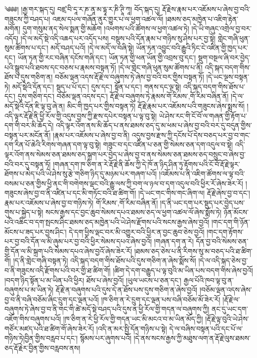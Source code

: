 \setcounter{footnote}{0} 
༄༅༅། །རྒྱ་གར་སྐད་དུ། བཛྲ་བི་དཱ་ར་ཎ་ནཱ་མ་དྷཱ་ར་ཎི་ཊཱི་ཀཱ། བོད་སྐད་དུ། རྡོ་རྗེས་རྣམ་པར་འཇོམས་པ་ཞེས་བྱ་བའི་གཟུངས་ཀྱི་བཤད་པ། འཇམ་དཔལ་གཞོན་ནུར་གྱུར་པ་ལ་ཕྱག་འཚལ་ལོ། །ཐམས་ཅད་མཁྱེན་པ་འཇིག་རྟེན་མགོན། དུག་གསུམ་ནད་སེལ་སྨན་གྱི་མཆོག །འཕགས་པའི་ཚོགས་ལ་ཕྱག་འཚལ་ཏེ། །དེ་ཡི་གཞུང་འགྲེལ་བྱ་བར་འདོད། །དེ་ལ་མདོ་སྡེ་འདི་འཆད་པར་འདོད་པས། བསྡུས་པའི་དོན་རྣམ་པ་གཉིས་སུ་ཤེས་པར་བྱ་སྟེ། གླེང་གཞི་ཕུན་སུམ་ཚོགས་པ་དང་། མདོ་བཤད་པའོ། །དེ་ལ་མདོ་ལ་བཞི་སྟེ། ཡོན་ཏན་འབྱུང་བའི་རྒྱུའི་ཏིང་ངེ་འཛིན་གྱི་ཁྱད་པར་དང་། ཡོན་ཏན་གྱི་རང་བཞིན་དངོས་གཞི་དང་། ཡོན་ཏན་གྱི་ཕན་ཡོན་གྱི་འབྲས་བུ་དང་། སྡུག་བསྔལ་ཞི་བར་བྱེད་པའི་སྒྲུབ་པའི་ཐབས་དང་བཅས་པ་རྣམས་བསྟན་ཏོ། །དེ་ལ་གླེང་གཞི་ཕུན་སུམ་ཚོགས་པ་ནི། འདི་སྐད་བདག་གིས་ཐོས་པ་དུས་གཅིག་ན། བཅོམ་ལྡན་འདས་རྡོ་རྗེ་ལ་བཞུགས་ཏེ་ཞེས་བྱ་བའི་བར་གྱིས་བསྟན་ཏོ། །དེ་ཡང་ལྔས་བསྟན་ཏེ། མདོ་སྡེའི་དོན་དང་། སྡུད་པ་པོ་དང་། དུས་དང་། སྟོན་པ་དང་། གནས་དང་ལྔ་སྟེ། འདི་སྐད་བདག་གིས་ཐོས་པ་དང་། དུས་གཅིག་དང་། བཅོམ་ལྡན་འདས་དང་། རྡོ་རྗེ་ལ་བཞུགས་ཏེ་རྣམས་{གོ་རིམས་,གོ་རིམ་}བཞིན་ནོ། །དེ་ལ་མདོ་སྡེའི་དོན་ཇི་ལྟ་བུ་ཞེ་ན། མིང་གི་ཁྱད་པར་གྱིས་བསྟན་ཏེ། རྡོ་རྗེ་རྣམ་པར་འཇོམས་པའི་གཟུངས་ཞེས་སྨྲས་སོ། །འདི་ལྟར་རྡོ་རྗེ་ནི་ཕྱི་རོལ་གྱི་འདུས་བྱས་ཀྱི་རྫས་དཔེར་བསྟན་པ་ལྟ་བུ་སྟེ། ཡེ་ཤེས་རང་གི་ངོ་བོ་ལ་གཞན་གྱི་རྟོག་པ་དག་གི་བར་མི་ཆོད་དེ། འདི་ལྟར་འོག་ནས་མི་ཆོད་པ་ནས་ཐམས་ཅད་དུ་མ་ཕམ་པ་ཞེས་བྱ་བའི་བར་དུ་བདུན་གྱིས་བསྟན་པར་མངོན་ནོ། །རྣམ་པར་འཇོམས་པ་ཞེས་བྱ་བ་ནི། འདུས་བྱས་རྫས་ཀྱི་དངོས་པོ་དེས་བཅད་པར་བྱ་བ་གང་དག་རིན་པོ་ཆེའི་རིགས་གཞན་དག་ལྟ་བུ་སྟེ། གཟུང་བ་དང་འཛིན་པ་ཅན་གྱི་སེམས་ཅན་དག་འདུལ་བ་སྟེ། འདི་ལྟར་འོག་ནས་སེམས་ཅན་ཐམས་ཅད་སྐྲག་པར་བྱེད་པ་ཞེས་བྱ་བ་ནས་སེམས་ཅན་ཐམས་ཅད་བསྲུང་བ་ཞེས་བྱ་བའི་བར་དུ་བསྟན་ཏོ། །གཞན་དག་ཁ་ཅིག་ན་རེ་རྡོ་རྗེ་ནི་ཆོས་ཀྱི་དེ་ཁོ་ན་ཉིད་ཤིན་ཏུ་རྟོགས་པའི་ངོ་བོ་རྡོ་རྗེ་ལྟར་ཐོགས་པ་མེད་པའི་ཡེ་ཤེས་སུ་རྩེ་གཅིག་ཉིད་དུ་མཉམ་པར་གཞག་པའོ། །འཇོམས་པ་ནི་འཇིག་ཚོགས་ལ་ལྟ་བའི་བསམ་པ་ཅན་གྱིས་ཕྱི་ནང་གི་བགེགས་ལྡང་བའི་རྒྱུ་ལས་ཀྱི་བག་ལ་ཉལ་བ་དག་འདུལ་བའི་ཕྱིར་རོ་ཞེས་ཟེར་རོ། །གཟུངས་ཞེས་བྱ་བ་ནི་འཛིན་པ་དང་མི་གཏོང་བའི་ཐ་ཚིག་གོ། །དེ་ཡང་གང་གིས་གང་ཞིག་ལ། རྡོ་རྗེ་ཞེས་བྱ་བ་དང་། རྣམ་པར་འཇོམས་པ་ཞེས་བྱ་བ་གཉིས་ཏེ། {གོ་རིམས་,གོ་རིམ་}བཞིན་ནོ། །ད་ནི་ཡང་དག་པར་སྡུད་པར་བྱེད་པས་གུས་པ་སྐྱེད་པ་སྟེ། སངས་རྒྱས་དང་བྱང་ཆུབ་སེམས་དཔའ་ཐམས་ཅད་ལ་ཕྱག་འཚལ་ལོ་ཞེས་སྨོས་ཏེ། ཉོན་མོངས་པའི་འཆིང་བ་དག་སྤངས་ཤིང་ཐམས་ཅད་མཁྱེན་པའི་ཡེ་ཤེས་རྫོགས་པའི་སངས་རྒྱས་ཞེས་བྱའོ། །གང་དག་གི་ཉོན་མོངས་པ་ཟད་པར་བྱས་ཤིང་། དེ་དག་ཕྱིས་ལྡང་བར་མི་འགྱུར་བའི་ཕྱིར་ན་བྱང་ཆུབ་ཅེས་བྱའོ། །གང་དག་རྟོགས་པར་བྱ་བའི་དོན་ལ་མི་ཞུམ་པར་བྱ་བའི་ཕྱིར་སེམས་དཔའ་ཞེས་བྱའོ། །གཞན་དག་ན་རེ། དོན་བྱ་བའི་སེམས་ཅན་གྱི་དོན་ལ་མི་སྐྲག་པའི་སེམས་དཔའ་ཞེས་བྱའོ་ཞེས་ཟེར་རོ། །ཐམས་ཅད་ཅེས་པ་ནི་རིགས་སུ་མ་བཅད་པའི་ཐ་ཚིག་གོ། །ད་ནི་གླེང་གཞི་བསྟན་ཏེ། འདི་སྐད་བདག་གིས་ཐོས་པའི་དུས་གཅིག་ན་ཞེས་སྨོས་སོ། །དེ་ལ་འདི་སྐད་ཅེས་བྱ་བ་ནི་གཟུངས་འདི་རྫོགས་པའི་བར་གྱི་ཐ་ཚིག་གོ། །ཚིག་དེ་དག་བརྒྱུད་པ་ལྟ་བུའི་མ་ཡིན་པས་བདག་གིས་ཞེས་བྱའོ། །བདག་ཉིད་སྟོན་པ་མ་ཡིན་པའི་ཕྱིར། ཐོས་པ་ཞེས་བྱའོ། །ཡུལ་ཡངས་པ་ཅན་དང་། རྒྱལ་པོའི་ཁབ་ལྟ་བུ་ན་བཞུགས་པ་མ་ཡིན་ཏེ། རྡོ་རྗེ་ན་བཞུགས་པའི་དུས་དེ་ན་ཐོས་པས་དུས་གཅིག་ན་ཞེས་བྱའོ། །བཅོམ་ལྡན་འདས་ཞེས་བྱ་བ་ནི་བཞི་བཅོམ་ཞིང་དྲུག་དང་ལྡན་པའོ། །ཁ་ཅིག་ན་རེ་དྲུག་དང་ལྡན་པས་བཞི་བཅོམ་མོ་ཟེར་རོ། །རྡོ་རྗེ་ལ་བཞུགས་ཏེ་ཞེས་བྱ་བ་ནི་གང་གི་ཚེ་མདོ་སྡེ་བཤད་པའི་དུས་ན་ཕྱི་རོལ་གྱི་གདན་ལ་བཞུགས་ཀྱི། ནང་དུ་ཡང་དག་འཇོག་གིས་བཞུགས་པའོ། །ཁ་ཅིག་ན་རེ་ཕྱི་རོལ་གྱི་གདན་ཡང་མི་མངའ་བ་མ་ཡིན་མོད་ཀྱི། །རྡོ་རྗེ་ལྟ་བུའི་ཡེ་ཤེས་གཙོར་མཛད་པའི་ཐ་ཚིག་གོ་ཞེས་ཟེར་རོ། །འདི་ན་མར་སྤྱི་དོན་གཉིས་པ་སྟེ། དེ་ལ་བཞིས་བསྟན་པའི་དང་པོ་ལ་གཉིས་ཏེ།བྱིན་གྱིས་བརླབ་པ་དང་། སྙོམས་པར་ཞུགས་པའོ། །དེ་ནས་སངས་རྒྱས་ཀྱི་མཐུས་ལག་ན་རྡོ་རྗེ་ལུས་ཐམས་ཅད་རྡོ་རྗེར་བྱིན་གྱིས་བརླབས་ནས། 